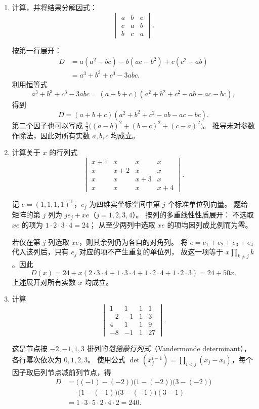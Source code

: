\documentclass[UTF8,12pt,a4paper,fontset=fandol]{ctexart}
\begin{document}
\begin{enumerate}[label=\arabic*.]
\item\label{q:detcalc-cyclic-three}
计算，并将结果分解因式：
\[
\begin{vmatrix}
a&b&c\\
c&a&b\\
b&c&a
\end{vmatrix}.
\]

\begin{solve}
按第一行展开：
\begin{align*}
D&=a(a^2-bc)-b(ac-b^2)+c(c^2-ab)\\
&=a^3+b^3+c^3-3abc.
\end{align*}
利用恒等式
\[
a^3+b^3+c^3-3abc
=(a+b+c)(a^2+b^2+c^2-ab-ac-bc),
\]
得到
\[
\boxed{D=(a+b+c)(a^2+b^2+c^2-ab-ac-bc).}
\]
第二个因子也可以写成
$\tfrac12\bigl((a-b)^2+(b-c)^2+(c-a)^2\bigr)$。
推导未对参数作除法，因此对所有实数 $a,b,c$ 均成立。
\end{solve}

\item\label{q:detcalc-parameter}
计算关于 $x$ 的行列式
\[
\begin{vmatrix}
x+1&x&x&x\\
x&x+2&x&x\\
x&x&x+3&x\\
x&x&x&x+4
\end{vmatrix}.
\]

\begin{solve}
记 $e=(1,1,1,1)^{\mathsf T}$，$e_j$ 为四维实坐标空间中第 $j$ 个标准单位列向量。
题给矩阵的第 $j$ 列为 $je_j+xe$（$j=1,2,3,4$）。
按列的多重线性性质展开：
不选取 $xe$ 的项为 $1\cdot2\cdot3\cdot4=24$；
从至少两列中选取 $xe$ 的项均因列成比例而为零。

若仅在第 $j$ 列选取 $xe$，则其余列仍为各自的对角列。
将 $e=e_1+e_2+e_3+e_4$ 代入该列后，只有 $e_j$ 对应的项不产生重复的单位列，
故这一项等于 $x\prod_{k\ne j}k$。因此
\[
D(x)=24+x(2\cdot3\cdot4+1\cdot3\cdot4+1\cdot2\cdot4+1\cdot2\cdot3)
=\boxed{24+50x}.
\]
上述展开对所有实数 $x$ 均成立。
\end{solve}

\item\label{q:detcalc-powers}
计算
\[
\begin{vmatrix}
1&1&1&1\\
-2&-1&1&3\\
4&1&1&9\\
-8&-1&1&27
\end{vmatrix}.
\]

\begin{solve}
这是节点按 $-2,-1,1,3$ 排列的\emph{范德蒙行列式}（Vandermonde determinant），
各行幂次依次为 $0,1,2,3$。
使用公式 $\det(x_j^{i-1})=\prod_{i<j}(x_j-x_i)$，每个因子取后列节点减前列节点，得
\begin{align*}
D&=\bigl((-1)-(-2)\bigr)\bigl(1-(-2)\bigr)\bigl(3-(-2)\bigr)\\
&\quad\cdot\bigl(1-(-1)\bigr)\bigl(3-(-1)\bigr)(3-1)\\
&=1\cdot3\cdot5\cdot2\cdot4\cdot2=\boxed{240}.
\end{align*}
\end{solve}


\end{enumerate}
\end{document}
